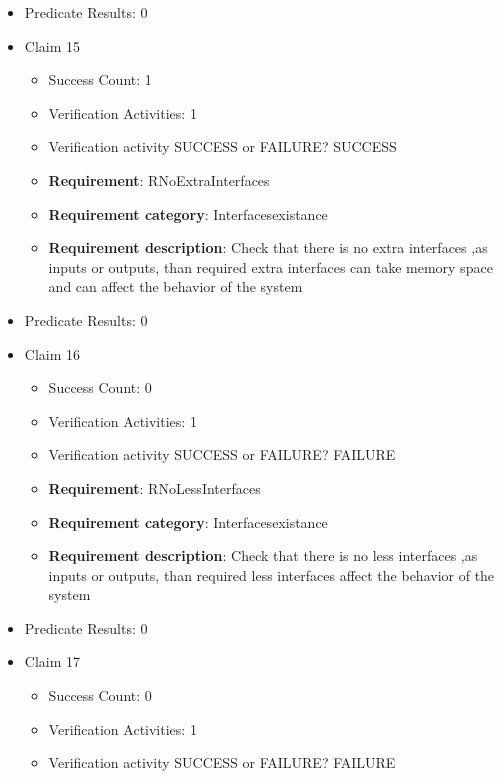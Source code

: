 \documentclass{article}
\begin{document}
\begin{itemize}
\begin{itemize}
				\end{itemize}
				
									    
				\item Predicate Results: 0

  				  \item Claim 15
				\begin{itemize}
			    	\item Success Count: 1 
			    	\item Verification Activities: 1
					\item Verification activity SUCCESS or FAILURE? SUCCESS
		
						\item \textbf{Requirement}: RNoExtraInterfaces 
						\item \textbf{Requirement category}: Interfacesexistance 
						\item \textbf{Requirement description}: Check that there is no extra interfaces ,as inputs or outputs, than required  extra interfaces can take memory space and can affect the behavior of the system
					
				\end{itemize}
				
									    
				\item Predicate Results: 0

  				  \item Claim 16
				\begin{itemize}
			    	\item Success Count: 0 
			    	\item Verification Activities: 1
					\item Verification activity SUCCESS or FAILURE? FAILURE
		
						\item \textbf{Requirement}: RNoLessInterfaces 
						\item \textbf{Requirement category}: Interfacesexistance 
						\item \textbf{Requirement description}: Check that there is no less interfaces ,as inputs or outputs, than required  less interfaces affect the behavior of the system
					
				\end{itemize}
				
									    
				\item Predicate Results: 0

  				  \item Claim 17
				\begin{itemize}
			    	\item Success Count: 0 
			    	\item Verification Activities: 1
					\item Verification activity SUCCESS or FAILURE? FAILURE
		

\end{itemize}
\end{itemize}
\end{document}
